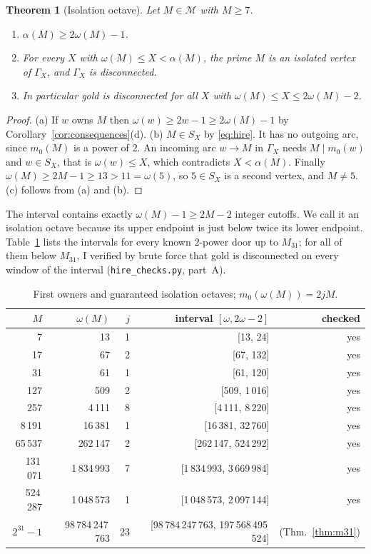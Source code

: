 \documentclass[11pt,a4paper]{article}
\newtheorem{theorem}{Theorem}[section]
\theoremstyle{remark}
\newcommand{\pow}{\mathcal{M}}   %
\begin{document}
\begin{theorem}[Isolation octave]\label{thm:octave}
Let \(M\in\pow\) with \(M\ge7\).
\begin{enumerate}
\item[(a)] \(\alpha(M)\ge 2\omega(M)-1\).
\item[(b)] For every \(X\) with \(\omega(M)\le X<\alpha(M)\), the prime \(M\) is an isolated vertex of \(\Gamma_X\), and \(\Gamma_X\) is disconnected.
\item[(c)] In particular gold is disconnected for all \(X\) with \(\omega(M)\le X\le 2\omega(M)-2\).
\end{enumerate}
\end{theorem}
\begin{proof}
(a) If \(w\) owns \(M\) then \(\omega(w)\ge 2w-1\ge 2\omega(M)-1\) by Corollary~\ref{cor:consequences}(d).
(b) \(M\in S_X\) by \eqref{eq:hire}.
It has no outgoing arc, since \(m_0(M)\) is a power of \(2\).
An incoming arc \(w\to M\) in \(\Gamma_X\) needs \(M\mid m_0(w)\) and \(w\in S_X\), that is \(\omega(w)\le X\), which contradicts \(X<\alpha(M)\).
Finally \(\omega(M)\ge 2M-1\ge 13>11=\omega(5)\), so \(5\in S_X\) is a second vertex, and \(M\ne5\).
(c) follows from (a) and (b).
\end{proof}

The interval contains exactly \(\omega(M)-1\ge2M-2\) integer cutoffs. We call it an isolation octave because its upper endpoint is just below twice its lower endpoint.
Table~\ref{tab:octaves} lists the intervals for every known \(2\)-power door up to \(M_{31}\); for all of them below \(M_{31}\), I verified by brute force that gold is disconnected on every window of the interval (\texttt{hire\_checks.py}, part~A).

\begin{table}[ht]
\centering\small
\begin{tabular}{rrrrr}
\toprule
\(M\) & \(\omega(M)\) & \(j\) & interval \([\omega,2\omega-2]\) & checked \\
\midrule
7 & 13 & 1 & [13, 24] & yes\\
17 & 67 & 2 & [67, 132] & yes\\
31 & 61 & 1 & [61, 120] & yes\\
127 & 509 & 2 & [509, 1\,016] & yes\\
257 & 4\,111 & 8 & [4\,111, 8\,220] & yes\\
8\,191 & 16\,381 & 1 & [16\,381, 32\,760] & yes\\
65\,537 & 262\,147 & 2 & [262\,147, 524\,292] & yes\\
131\,071 & 1\,834\,993 & 7 & [1\,834\,993, 3\,669\,984] & yes\\
524\,287 & 1\,048\,573 & 1 & [1\,048\,573, 2\,097\,144] & yes\\
\(2^{31}-1\) & 98\,784\,247\,763 & 23 & [98\,784\,247\,763, 197\,568\,495\,524] & (Thm.~\ref{thm:m31})\\
\bottomrule
\end{tabular}
\caption{First owners and guaranteed isolation octaves; \(m_0(\omega(M))=2jM\).}
\label{tab:octaves}
\end{table}
\end{document}

